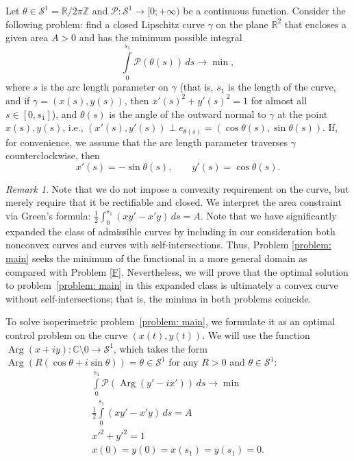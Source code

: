 \documentclass[a4paper,12pt]{article}
\newcommand {\PPP}{\mathcal{P}}
\newcommand {\SSS}{\mathcal{S}^1}
\theoremstyle{remark}
\newtheorem{remark}{Remark}
\theoremstyle{definition}
\begin{document}
Let $\theta \in \SSS = \mathbb{R} / 2\pi\mathbb{Z}$ and $\PPP: \SSS \to [0;+\infty)$ be a continuous function. Consider the following problem: find a closed Lipschitz curve $\gamma$ on the plane $\mathbb{R}^2$ that encloses a given area $A > 0$ and has the minimum possible integral
\begin{equation}
	\label{problem: main}
	\int\limits_0^{s_1} \PPP(\theta(s))\,ds\to\min,
\end{equation}
where $s$ is the arc length parameter on $\gamma$ (that is, $s_1$ is the length of the curve, and if $\gamma = (x(s), y(s))$, then $x'(s)^2 + y'(s)^2 = 1$ for almost all $s \in [0, s_1]$), and $\theta(s)$ is the angle of the outward normal to $\gamma$ at the point $x(s), y(s)$, i.e., $(x'(s), y'(s)) \perp e_{\theta(s)} = (\cos\theta(s), \sin\theta(s))$. If, for convenience, we assume that the arc length parameter traverses $\gamma$ counterclockwise, then
$$
x'(s) = -\sin \theta(s), \qquad y'(s) = \cos \theta(s).
$$

\begin{remark}
	
Note that we do not impose a convexity requirement on the curve, but merely require that it be rectifiable and closed. We interpret the area constraint via Green's formula: $\frac12\int_0^{s_1}(xy'-x'y)\,ds=A$. Note that we have significantly expanded the class of admissible curves by including in our consideration both nonconvex curves and curves with self-intersections. Thus, Problem \eqref{problem: main} seeks the minimum of the functional in a more general domain as compared with Problem \eqref{F}. Nevertheless, we will prove that the optimal solution to problem~\eqref{problem: main} in this expanded class is ultimately a convex curve without self-intersections; that is, the minima in both problems coincide.
	
\end{remark}

To solve isoperimetric problem~\eqref{problem: main}, we formulate it as an optimal control problem on the curve $(x(t), y(t))$. We will use the function $\operatorname{Arg}(x+iy):\mathbb{C}\setminus 0 \to \SSS$, which takes the form $\operatorname{Arg}(R(\cos\theta+i\sin\theta))=\theta\in \SSS$ for any $R>0$ and $\theta\in \SSS$:
$$
\begin{gathered}
	\int\limits_0^{s_1} \PPP(\operatorname{Arg}(y'-ix'))\,ds \to \min \\
	\frac{1}{2} \int\limits_0^{s_1} (xy' - x'y)\,ds = A \\
	x'^2 + y'^2 = 1 \\
	x(0) = y(0) = x(s_1) = y(s_1) = 0.
\end{gathered}
$$
\end{document}
